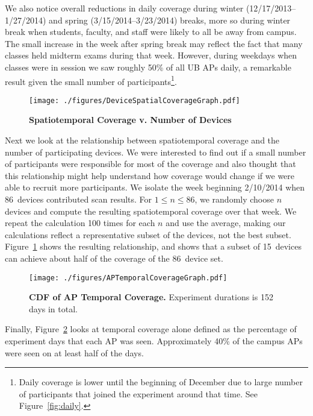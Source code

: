 We also notice overall reductions in daily coverage during winter
(12/17/2013--1/27/2014) and spring (3/15/2014--3/23/2014) breaks, more so
during winter break when students, faculty, and staff were likely to all be
away from campus. The small increase in the week after spring break may
reflect the fact that many classes held midterm exams during that week.
However, during weekdays when classes were in session we saw roughly 50\% of
all UB APs daily, a remarkable result given the small number of
participants\footnote{Daily coverage is lower until the beginning of December
due to large number of participants that joined the experiment around that
time. See Figure~\ref{fig:daily}.}.

\begin{figure}[t]
  \centering
  \texttt{[image: ./figures/DeviceSpatialCoverageGraph.pdf]}
  \caption{\textbf{Spatiotemporal Coverage v. Number of Devices}}
  \label{fig:device_coverage}
\end{figure}

Next we look at the relationship between spatiotemporal coverage and the
number of participating devices. We were interested to find out if a small
number of participants were responsible for most of the coverage and also
thought that this relationship might help understand how coverage would
change if we were able to recruit more participants. We isolate the week
beginning 2/10/2014 when 86~devices contributed scan results. For $1 \le n
\le 86$, we randomly choose $n$ devices and compute the resulting
spatiotemporal coverage over that week. We repeat the calculation 100 times
for each $n$ and use the average, making our calculations reflect a
representative subset of the devices, not the best subset.
Figure~\ref{fig:device_coverage} shows the resulting relationship, and shows
that a subset of 15~devices can achieve about half of the coverage of the
86~device set.

\begin{figure}[t]
  \centering
  \texttt{[image: ./figures/APTemporalCoverageGraph.pdf]}
  \caption{\textbf{CDF of AP Temporal Coverage.} Experiment durations is 152
  days in total.}
  \label{fig:temporal_coverage}
\end{figure}

Finally, Figure~\ref{fig:temporal_coverage} looks at temporal coverage alone
defined as the percentage of experiment days that each AP was seen.
Approximately 40\% of the campus APs were seen on at least half of the days.

